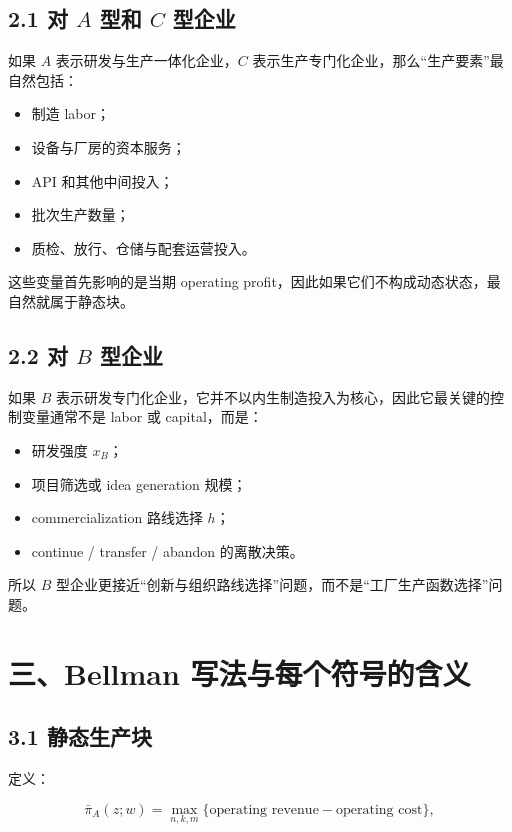 \documentclass[12pt]{ctexart}
\begin{document}
\subsection{2.1 对 \(A\) 型和 \(C\) 型企业}

如果 \(A\) 表示研发与生产一体化企业，\(C\) 表示生产专门化企业，那么“生产要素”最自然包括：

\begin{itemize}[leftmargin=2em]
    \item 制造 labor；
    \item 设备与厂房的资本服务；
    \item API 和其他中间投入；
    \item 批次生产数量；
    \item 质检、放行、仓储与配套运营投入。
\end{itemize}

这些变量首先影响的是当期 operating profit，因此如果它们不构成动态状态，最自然就属于静态块。

\subsection{2.2 对 \(B\) 型企业}

如果 \(B\) 表示研发专门化企业，它并不以内生制造投入为核心，因此它最关键的控制变量通常不是 labor 或 capital，而是：

\begin{itemize}[leftmargin=2em]
    \item 研发强度 \(x_B\)；
    \item 项目筛选或 idea generation 规模；
    \item commercialization 路线选择 \(h\)；
    \item continue / transfer / abandon 的离散决策。
\end{itemize}

所以 \(B\) 型企业更接近“创新与组织路线选择”问题，而不是“工厂生产函数选择”问题。

\section{三、Bellman 写法与每个符号的含义}

\subsection{3.1 静态生产块}

定义：

\[
\bar{\pi}_A(z;w)
=
\max_{n,k,m}
\{\text{operating revenue}-\text{operating cost}\},
\]
\end{document}
